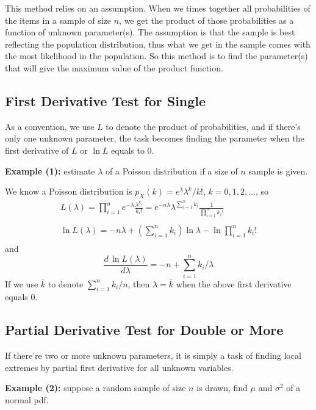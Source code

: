 \documentclass[11pt]{article}
\begin{document}
This method relies on an assumption.  When we times together all probabilities of the items in a sample of size $n$,  we get the product of those probabilities as a function of unknown parameter(s).   The assumption is that the sample is best reflecting the population distribution,  thus what we get in the sample comes with the most likelihood in the population.  So this method is to find the parameter(s) that will give the maximum value of the product function. 


\subsection{\small First Derivative Test for Single}

As a convention,  we use $L$ to denote the product of probabilities,  and if there's only one unknown parameter,  the task becomes finding the parameter when the first derivative of $L$ or $\ln L$ equals to 0.  

\textbf{Example (1): } estimate $\lambda$ of a Poisson distribution if a size of $n$ sample is given.

We know a Poisson distribution is $p_X(k) = e^{\lambda} \lambda ^k / k!,  \,  k=0, 1,2,\dots$,  so
\[
\begin{array}{c}
L(\lambda) =\displaystyle \prod _{i=1} ^n e^{-\lambda} \frac{\lambda^{k_i} }{k_i !} = e^{-n \lambda} \lambda ^{\sum _{i=1} ^n k_i} \frac{1}{\prod _{i=1} ^n k_i !}  \\
\\
\displaystyle \ln L(\lambda) = -n \lambda + \left( \sum _{i=1} ^n k_i \right) \ln \lambda - \ln \prod _{i=1} ^n k_i ! \\
\end{array}
\]
and 
\[
\frac{d \, \ln L(\lambda)}{d\lambda} = -n +  \sum _{i=1} ^n k_i  / \lambda
\]
If we use $\overline{k}$ to denote $\displaystyle \sum _{i=1} ^n k_i  / n$,  then $\lambda = \overline{k}$ when the above first derivative equals 0.


\subsection{\small Partial Derivative Test for Double or More}

If there're two or more unknown parameters,  it is simply a task of finding local extremes by partial first derivative for all unknown variables. 

\textbf{Example (2):} suppose a random sample of size $n$ is drawn,  find $\mu$ and $\sigma ^2$ of a normal pdf.
\end{document}
